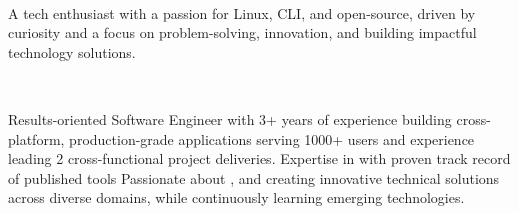 \documentclass[11pt,a4paper]{article}
\begin{document}
\sloppy
{}

{} \\[0.5em]
{\subheadingstyle A tech enthusiast with a passion for Linux, CLI, and open-source, driven by curiosity and a focus on problem-solving, innovation, and building impactful technology solutions.}

{\color{accent}
\small
\noindent
   \quad \textbar{} \quad
   \quad \textbar{} \quad
   \quad \textbar{} \quad
   \quad \quad \\
   \quad \textbar{} \quad
   \quad \textbar{} \quad
}

\divider  %

\begin{body}Results-oriented Software Engineer with 3+ years of experience building cross-platform, production-grade applications serving 1000+ users and experience leading 2 cross-functional project deliveries. Expertise in {} with proven track record of published tools {} Passionate about {}, and creating innovative technical solutions across diverse domains, while continuously learning emerging technologies.
\end{body}
\end{document}
